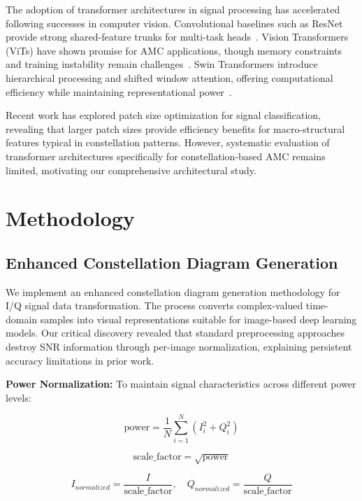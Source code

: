 \documentclass{ELSP}
\begin{document}
The adoption of transformer architectures in signal processing has accelerated following successes in computer vision. Convolutional baselines such as ResNet provide strong shared-feature trunks for multi-task heads~\cite{he2016deep}. Vision Transformers (ViTs) have shown promise for AMC applications, though memory constraints and training instability remain challenges~\cite{vit2020}. Swin Transformers introduce hierarchical processing and shifted window attention, offering computational efficiency while maintaining representational power~\cite{swin2021}.

Recent work has explored patch size optimization for signal classification, revealing that larger patch sizes provide efficiency benefits for macro-structural features typical in constellation patterns. However, systematic evaluation of transformer architectures specifically for constellation-based AMC remains limited, motivating our comprehensive architectural study.

\section{Methodology}

\subsection{Enhanced Constellation Diagram Generation}

We implement an enhanced constellation diagram generation methodology for I/Q signal data transformation. The process converts complex-valued time-domain samples into visual representations suitable for image-based deep learning models. Our critical discovery revealed that standard preprocessing approaches destroy SNR information through per-image normalization, explaining persistent accuracy limitations in prior work.

\textbf{Power Normalization:} To maintain signal characteristics across different power levels:

\begin{equation}
\text{power} = \frac{1}{N} \sum_{i=1}^{N} (I_i^2 + Q_i^2)
\end{equation}

\begin{equation}
\text{scale\_factor} = \sqrt{\text{power}}
\end{equation}

\begin{equation}
I_{normalized} = \frac{I}{\text{scale\_factor}}, \quad Q_{normalized} = \frac{Q}{\text{scale\_factor}}
\end{equation}
\end{document}
